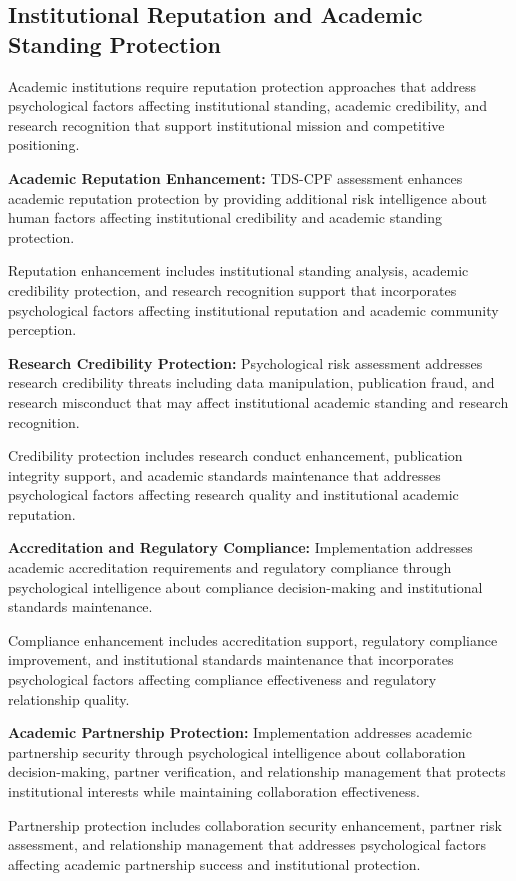 \documentclass[10pt, twocolumn]{article}
\begin{document}
\subsection{Institutional Reputation and Academic Standing Protection}

Academic institutions require reputation protection approaches that address psychological factors affecting institutional standing, academic credibility, and research recognition that support institutional mission and competitive positioning.

\textbf{Academic Reputation Enhancement:} TDS-CPF assessment enhances academic reputation protection by providing additional risk intelligence about human factors affecting institutional credibility and academic standing protection.

Reputation enhancement includes institutional standing analysis, academic credibility protection, and research recognition support that incorporates psychological factors affecting institutional reputation and academic community perception.

\textbf{Research Credibility Protection:} Psychological risk assessment addresses research credibility threats including data manipulation, publication fraud, and research misconduct that may affect institutional academic standing and research recognition.

Credibility protection includes research conduct enhancement, publication integrity support, and academic standards maintenance that addresses psychological factors affecting research quality and institutional academic reputation.

\textbf{Accreditation and Regulatory Compliance:} Implementation addresses academic accreditation requirements and regulatory compliance through psychological intelligence about compliance decision-making and institutional standards maintenance.

Compliance enhancement includes accreditation support, regulatory compliance improvement, and institutional standards maintenance that incorporates psychological factors affecting compliance effectiveness and regulatory relationship quality.

\textbf{Academic Partnership Protection:} Implementation addresses academic partnership security through psychological intelligence about collaboration decision-making, partner verification, and relationship management that protects institutional interests while maintaining collaboration effectiveness.

Partnership protection includes collaboration security enhancement, partner risk assessment, and relationship management that addresses psychological factors affecting academic partnership success and institutional protection.
\end{document}
